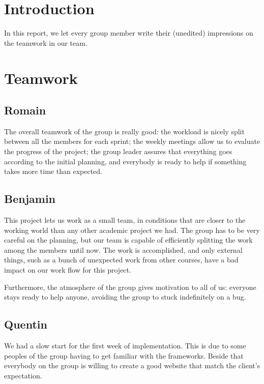 \section{Introduction}

In this report, we let every group member write their
(unedited) impressions on the teamwork in our team.

\section{Teamwork}


\subsection{Romain}
The overall teamwork of the group is really good: the workload is nicely
split between all the members for each sprint; the weekly meetings allow
us to evaluate the progress of the project; the group leader assures that
everything goes according to the initial planning, and everybody is ready to
help if something takes more time than expected. \newline

\subsection{Benjamin}

This project lets us work as a small team, in conditions that are closer to
the working world than any other academic project we had. The group has to
be very careful on the planning, but our team is capable of efficiently
splitting the work among the members until now. The work is accomplished,
and only external things, such as a bunch of unexpected work from other
courses, have a bad impact on our work flow for this project. \newline

Furthermore, the atmosphere of the group gives motivation to all of us:
everyone stays ready to help anyone, avoiding the group to stuck
indefinitely on a bug.

\subsection{Quentin}
We had a slow start for the first week of implementation. This is due to
some peoples of the group having to get familiar with the frameworks.
Beside that everybody on the group is willing to create a good website that
match the client's expectation. \newline

